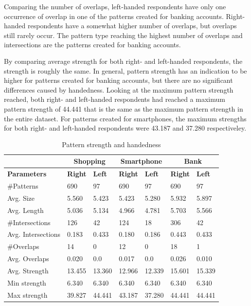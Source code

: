     Comparing the number of overlaps, left-handed respondents have only one occurrence of overlap in one of the patterns created for banking accounts. Right-handed respondents have a somewhat higher number of overlaps, but overlaps still rarely occur. The pattern type reaching the highest number of overlaps and intersections are the patterns created for banking accounts.

    By comparing average strength for both right- and left-handed respondents, the strength is roughly the same. In general, pattern strength has an indication to be higher for patterns created for banking accounts, but there are no significant differences caused by handedness. Looking at the maximum pattern strength reached, both right- and left-handed respondents had reached a maximum pattern strength of 44.441 that is the same as the maximum pattern strength in the entire dataset. For patterns created for smartphones, the maximum strengths for both right- and left-handed respondents were 43.187 and 37.280 respectiveley. 

      \begin{table}[H]
        \centering
        \begin{tabular}{l || l | l || l | l || l | l }
          \hline
           & \multicolumn{2}{c||}{\bf Shopping} & \multicolumn{2}{c||}{\bf Smartphone} &\multicolumn{2}{c}{\bf Bank} \\ \hline
          {\bf Parameters}   & {\bf Right} & {\bf Left} & {\bf Right} & {\bf Left} & {\bf Right} & {\bf Left}\\ \hline
          \#Patterns         & 690    & 97      & 690     & 97      & 690    & 97     \\
          Avg. Size          & 5.560  & 5.423   & 5.423   & 5.280   & 5.932  & 5.897  \\
          Avg. Length        & 5.036  & 5.134   & 4.966   & 4.781   & 5.703  & 5.566  \\
          \#Intersections    & 126    & 42      & 124     & 18      & 306    & 42     \\
          Avg. Intersections & 0.183  & 0.433   & 0.180   & 0.186   & 0.443  & 0.433  \\
          \#Overlaps         & 14     & 0       & 12      & 0       & 18     & 1      \\
          Avg. Overlaps      & 0.020  & 0.0     & 0.017   & 0.0     & 0.026  & 0.010  \\ \hline
          Avg. Strength      & 13.455 & 13.360  & 12.966  & 12.339  & 15.601 & 15.339 \\ 
          Min strength       & 6.340  & 6.340   & 6.340   & 6.340   & 6.340  & 6.340  \\
          Max strength       & 39.827 & 44.441  & 43.187  & 37.280  & 44.441 & 44.441 \\ \hline
        \end{tabular}
        \caption{Pattern strength and handedness}
        \label{tab:handednessstrength} 
      \end{table}

